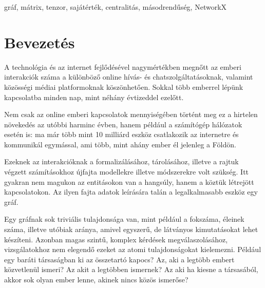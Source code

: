 \documentclass[12pt,numbers=noenddot]{report}
\begin{document}
gráf, mátrix, tenzor, sajátérték, centralitás, másodrendűség, NetworkX


\renewcommand{\contentsname}{Tartalomjegyzék}
\tableofcontents


\chapter{Bevezetés}
\pagestyle{fancy}

A technológia és az internet fejlődésével nagymértékben megnőtt az emberi 
interakciók száma a különböző online hívás- és chatszolgáltatásoknak, valamint
közösségi médiai platformoknak köszönhetően. Sokkal több emberrel lépünk
kapcsolatba minden nap, mint néhány évtizeddel ezelőtt.

Nem csak az online emberi kapcsolatok mennyiségében történt meg ez a hirtelen
növekedés az utóbbi harminc évben, hanem például a számítógép hálózatok esetén 
is: ma már több mint 10 milliárd eszköz csatlakozik az internetre és kommunikál 
egymással, ami több, mint ahány ember él jelenleg a Földön.

Ezeknek az interakcióknak a formalizálásához, tárolásához, illetve
a rajtuk végzett számításokhoz újfajta modellekre illetve módszerekre volt 
szükség. Itt gyakran nem magukon az entitásokon van a hangsúly, hanem a köztük
létrejött kapcsolatokon. Az ilyen fajta adatok leírására talán a legalkalmasabb
eszköz egy gráf.

Egy gráfnak sok triviális tulajdonsága van, mint például a fokszáma, éleinek 
száma, illetve utóbiak aránya, amivel egyszerű, de látványos kimutatásokat lehet
készíteni. Azonban magas szintű, komplex kérdések megválaszolásához, 
vizsgálatokhoz nem elegendő ezeket az atomi tulajdonságokat kielemezni. 
Például egy baráti társaságban ki az összetartó kapocs? Az, aki a legtöbb embert
közvetlenül ismeri? Az akit a legtöbben ismernek? Az aki ha kiesne a társasából,
akkor sok olyan ember lenne, akinek nincs közös ismerőse?
\end{document}
